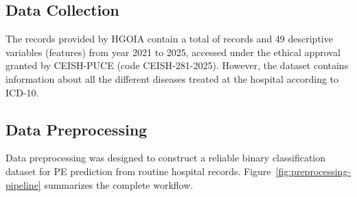 \documentclass[diagnostics,article,submit,pdftex,moreauthors]{Definitions/mdpi}
\begin{document}
\subsection{Data Collection}
\label{sec:data-collection}
The records provided by \ac{HGOIA} contain a total of  records and 49
descriptive variables (features) from year 2021 to 2025, accessed
under the ethical approval granted by CEISH-\ac{PUCE} (code
CEISH-281-2025). However, the dataset contains information about all
the different diseases treated at the hospital according to
\ac{ICD-10}.

\subsection{Data Preprocessing}
\label{sec:data-preprocessing}

Data preprocessing was designed to construct a reliable binary
classification dataset for \ac{PE} prediction from routine
hospital records. Figure~\ref{fig:preprocessing-pipeline} summarizes
the complete workflow.
\end{document}
